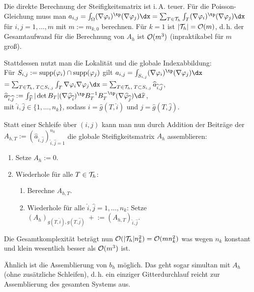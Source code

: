 \begin{Bem}
    Die direkte Berechnung der Steifigkeitsmatrix ist i.\,A. teuer.
    Für die Poisson-Gleichung muss man
    $a_{i,j} = \int_\Omega (\nabla\varphi_i)^\tp (\nabla\varphi_j) \dx
    = \sum_{T \in \T_h} \int_T (\nabla\varphi_i)^\tp (\nabla\varphi_j) \dx$
    für $i,j = 1, \dotsc, m$ mit $m := m_{k,0}$ berechnen.
    Für $k = 1$ ist $|\mathcal{T}_h| = \mathcal{O}(m)$, d.\,h. der Gesamtaufwand für die Berechnung von $A_h$
    ist $\mathcal{O}(m^3)$ (inpraktikabel für $m$ groß).

    Stattdessen nutzt man die Lokalität und die globale Indexabbildung:\\
    Für $S_{i,j} := \operatorname{supp}(\varphi_i) \cap \operatorname{supp}(\varphi_j)$ gilt
    $a_{i,j} = \int_{S_{i,j}} (\nabla\varphi_i)^\tp (\nabla\varphi_j) \dx$\\
    $= \sum_{T \in \T_h,\; T \subset S_{i,j}} \int_T \nabla\varphi_i \nabla\varphi_j \dx
    = \sum_{T \in \T_h,\; T \subset S_{i,j}} \widehat{a}_{\widehat{i},\widehat{j}}$,
    $\widehat{a}_{\widehat{i},\widehat{j}}
    := \int_{\widehat{T}} |\det B_T| (\nabla\widehat{\varphi}_{\widehat{i}})^\tp
    B_T^{-1} B_T^{-\tp} (\nabla\widehat{\varphi}_{\widehat{j}}) \d\widehat{x}$,\\
    mit $\widehat{i}, \widehat{j} \in \{1, \dotsc, n_k\}$, sodass
    $i = \widehat{g}(T, \widehat{i})$ und $j = \widehat{g}(T, \widehat{j})$.

    Statt einer Schleife über $(i,j)$ kann man nun durch Addition der Beiträge
    der 
    $A_{h,T} := (\widehat{a}_{\widehat{i},\widehat{j}})_{\widehat{i},\widehat{j}=1}^{n_k}$
    die globale Steifigkeitsmatrix $A_h$ assemblieren:
    \begin{enumerate}
        \item
        Setze $A_h := 0$.

        \item
        Wiederhole für alle $T \in \mathcal{T}_h$:
        \begin{enumerate}[label=\emph{(\roman*)}]
            \item
            Berechne $A_{h,T}$.

            \item
            Wiederhole für alle $\widehat{i}, \widehat{j} = 1, \dotsc, n_k$:
            Setze $(A_h)_{g(T,\widehat{i}),g(T,\widehat{j})} \;+\!\!:=
            (A_{h,T})_{\widehat{i},\widehat{j}}$.
        \end{enumerate}
    \end{enumerate}
    Die Gesamtkomplexität beträgt nun $\mathcal{O}(|\mathcal{T}_h| n_k^2) = \mathcal{O}(mn_k^2)$
    was wegen $n_k$ konstant und klein wesentlich besser als $\mathcal{O}(m^3)$ ist.

    Ähnlich ist die Assemblierung von $b_h$ möglich.
    Das geht sogar simultan mit $A_h$ (ohne zusätzliche Schleifen),
    d.\,h. ein einziger Gitterdurchlauf reicht zur Assemblierung des gesamten Systems aus.
\end{Bem}

